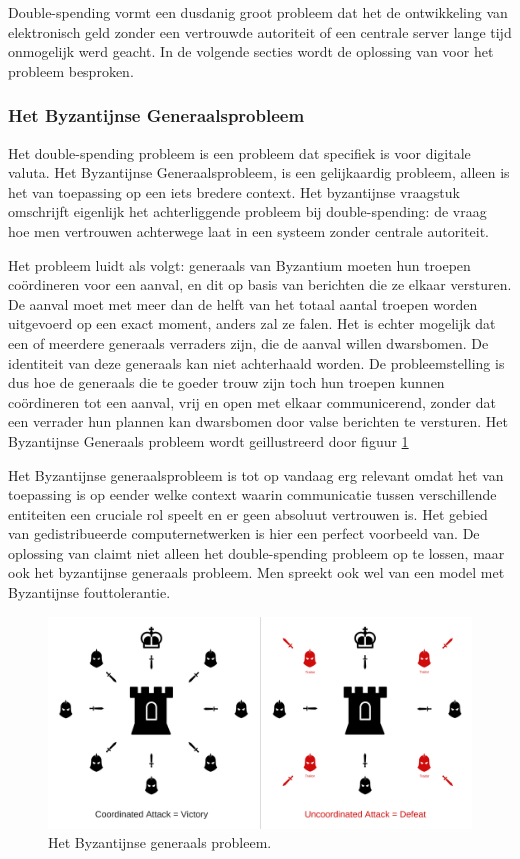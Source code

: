 			Double-spending vormt een dusdanig groot probleem dat het de ontwikkeling van elektronisch geld zonder een vertrouwde autoriteit of een centrale server lange tijd onmogelijk werd geacht. In de volgende secties wordt de oplossing van \textcite{Nakamoto2008} voor het probleem besproken. 
			
			\subsubsection{Het Byzantijnse Generaalsprobleem}
			Het double-spending probleem is een probleem dat specifiek is voor digitale valuta. Het Byzantijnse Generaalsprobleem, is een gelijkaardig probleem, alleen is het van toepassing op een iets bredere context. Het byzantijnse vraagstuk omschrijft eigenlijk het achterliggende probleem bij double-spending: de vraag hoe men vertrouwen achterwege laat in een systeem zonder centrale autoriteit.
			
			Het probleem luidt als volgt: generaals van Byzantium moeten hun troepen coördineren voor een aanval, en dit op basis van berichten die ze elkaar versturen. De aanval moet met meer dan de helft van het totaal aantal troepen worden uitgevoerd op een exact moment, anders zal ze falen. Het is echter mogelijk dat een of meerdere generaals verraders zijn, die de aanval willen dwarsbomen. De identiteit van deze generaals kan niet achterhaald worden. De probleemstelling is dus hoe de generaals die te goeder trouw zijn toch hun troepen kunnen coördineren tot een aanval, vrij en open met elkaar communicerend, zonder dat een verrader hun plannen kan dwarsbomen door valse berichten te versturen. Het Byzantijnse Generaals probleem wordt geillustreerd door figuur \ref{fig:byzantium}
			
			Het Byzantijnse generaalsprobleem is tot op vandaag erg relevant omdat het van toepassing is op eender welke context waarin communicatie tussen verschillende entiteiten een cruciale rol speelt en er geen absoluut vertrouwen is. Het gebied van gedistribueerde computernetwerken is hier een perfect voorbeeld van. De oplossing van \textcite{Nakamoto2008} claimt niet alleen het double-spending probleem op te lossen, maar ook het byzantijnse generaals probleem. Men spreekt ook wel van een model met Byzantijnse fouttolerantie.
			
			\begin{figure}
				\includegraphics[width=\linewidth]{img/byzantine_generals.png}
				\caption{Het Byzantijnse generaals probleem.}
				\label{fig:byzantium}
			\end{figure}
			
